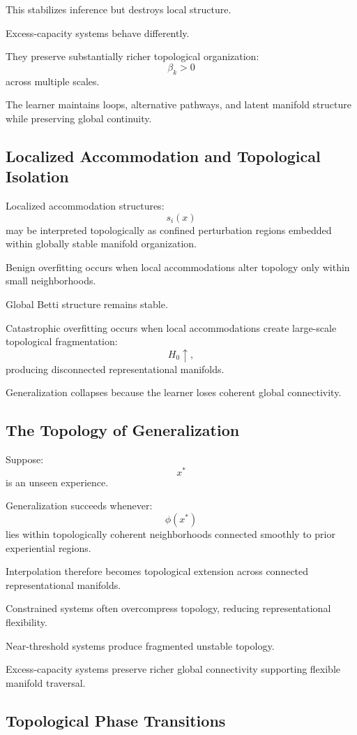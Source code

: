 \documentclass[12pt,a4paper]{article}
\begin{document}
This stabilizes inference but destroys local structure.

Excess-capacity systems behave differently.

They preserve substantially richer topological organization:
\[
\beta_k
>
0
\]
across multiple scales.

The learner maintains loops, alternative pathways, and latent manifold structure while preserving global continuity.

\subsection{Localized Accommodation and Topological Isolation}

Localized accommodation structures:
\[
s_i(x)
\]
may be interpreted topologically as confined perturbation regions embedded within globally stable manifold organization.

Benign overfitting occurs when local accommodations alter topology only within small neighborhoods.

Global Betti structure remains stable.

Catastrophic overfitting occurs when local accommodations create large-scale topological fragmentation:
\[
H_0
\uparrow,
\]
producing disconnected representational manifolds.

Generalization collapses because the learner loses coherent global connectivity.

\subsection{The Topology of Generalization}

Suppose:
\[
x^\ast
\]
is an unseen experience.

Generalization succeeds whenever:
\[
\phi(x^\ast)
\]
lies within topologically coherent neighborhoods connected smoothly to prior experiential regions.

Interpolation therefore becomes topological extension across connected representational manifolds.

Constrained systems often overcompress topology, reducing representational flexibility.

Near-threshold systems produce fragmented unstable topology.

Excess-capacity systems preserve richer global connectivity supporting flexible manifold traversal.

\subsection{Topological Phase Transitions}
\end{document}
